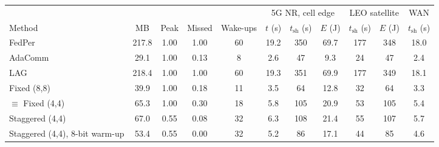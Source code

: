 \begin{tabular}{@{}lcccccccccc@{}}
\toprule
 & & & & & \multicolumn{3}{c}{5G NR, cell edge} & \multicolumn{2}{c}{LEO satellite} & WAN\\
\cmidrule(lr){6-8}\cmidrule(lr){9-10}\cmidrule(lr){11-11}
Method & MB & Peak & Missed & Wake-ups & $t$ (s) & $t_{\mathrm{sh}}$ (s) & $E$ (J) & $t_{\mathrm{sh}}$ (s) & $E$ (J) & $t_{\mathrm{sh}}$ (s)\\
\midrule
FedPer & 217.8 & 1.00 & 1.00 & 60 & 19.2 & 350 & 69.7 & 177 & 348 & 18.0\\
AdaComm & 29.1 & 1.00 & 0.13 & 8 & 2.6 & 47 & 9.3 & 24 & 47 & 2.4\\
LAG & 218.4 & 1.00 & 1.00 & 60 & 19.3 & 351 & 69.9 & 177 & 349 & 18.1\\
Fixed (8,8) & 39.9 & 1.00 & 0.18 & 11 & 3.5 & 64 & 12.8 & 32 & 64 & 3.3\\
\tierfed{} $\equiv$ Fixed (4,4) & 65.3 & 1.00 & 0.30 & 18 & 5.8 & 105 & 20.9 & 53 & 105 & 5.4\\
Staggered (4,4) & 67.0 & 0.55 & 0.08 & 32 & 6.3 & 108 & 21.4 & 55 & 107 & 5.7\\
Staggered (4,4), 8-bit warm-up & 53.4 & 0.55 & 0.00 & 32 & 5.2 & 86 & 17.1 & 44 & 85 & 4.6\\
\bottomrule
\end{tabular}
